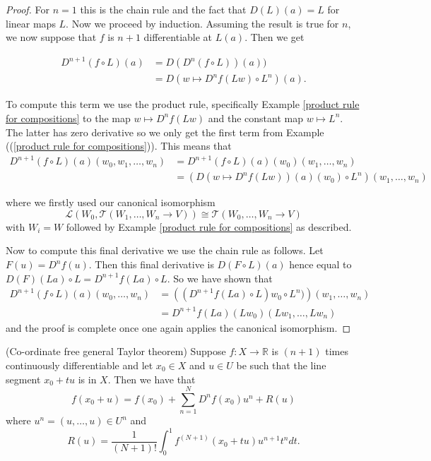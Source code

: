 \documentclass[twoside, a4paper, 10pt]{amsart}
\begin{document}
\begin{proof} For $n=1$ this is the chain rule and the fact that $D(L)(a)=L$ for linear maps $L$. Now we proceed by induction. Assuming the result is true for $n$, we now suppose that $f$ is $n+1$ differentiable at $L(a)$. Then we get

\begin{align*} D^{n+1}(f \circ L)(a)  &= D(D^n(f \circ L))(a)) \\ &= D( w \mapsto D^n f(Lw)  \circ L^n)(a). \end{align*} 

To compute this term we use the product rule, specifically Example \ref{product rule for compositions} to the map $w \mapsto D^nf(Lw)$ and the constant map $w \mapsto L^n$. The latter has zero derivative so we only get the first term from Example ((\ref{product rule for compositions})). This means that \begin{align*} D^{n+1}(f \circ L)(a) (w_0, w_1, \ldots, w_n) &= D^{n+1}(f \circ L)(a)(w_0) (w_1, \ldots, w_n) \\ &=( D( w \mapsto D^nf(Lw)) (a) (w_0) \circ L^n ) (w_1, \ldots, w_n) \end{align*}

where we firstly used our canonical isomorphism  $$\mathcal{L}(W_0, \mathcal{T}(W_1, \ldots, W_n \to V)) \cong \mathcal{T}(W_0, \ldots, W_n \to V)$$ with $W_i = W$ followed by Example \ref{product rule for compositions} as described.

 Now to compute this final derivative we use the chain rule as follows. Let $F(u) = D^nf(u)$. Then this final derivative is $D(F \circ L) (a)$ hence equal to $D(F)(La) \circ L= D^{n+1}f(La) \circ L$. So we have shown that \begin{align*} D^{n+1}(f \circ L)(a)(w_0, \ldots, w_n) &= \left((D^{n+1}f(La) \circ L)w_0 \circ L^n) \right) (w_1, \ldots, w_n) \\ &= D^{n+1}f(La) (Lw_0) (Lw_1, \ldots, Lw_n) \end{align*} and the proof is complete once one again applies the canonical isomorphism.
\end{proof}

\begin{thm}(Co-ordinate free general Taylor theorem) Suppose $f:X \to \mathbb{R}$ is $(n+1)$ times continuously differentiable and let $x_0 \in X$ and $u \in U$ be such that the line segment $x_0 + tu$ is in $X$. Then we have that $$f(x_0 + u) = f(x_0) + \sum_{n=1}^N D^n f(x_0) u^n + R(u)$$ where $u^n = (u, \ldots, u) \in U^n$ and $$R(u) =\frac{1}{(N+1)!} \int_{0}^1 f^{(N+1)}(x_0 + tu)u^{n+1} t^n dt  .$$  \end{thm}
\end{document}
